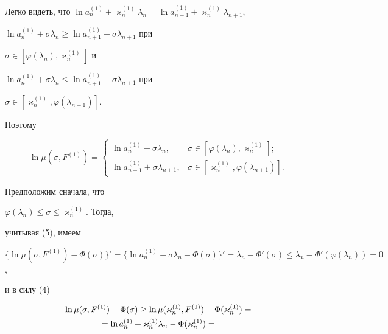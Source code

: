 \begin{pf}
Легко видеть, что $\ln a^{(1)}_n+\varkappa^{(1)}_n\lambda_n=


\ln a^{(1)}_{n+1}+\varkappa^{(1)}_n\lambda_{n+1}$,


$\ln a^{(1)}_n+\sigma\lambda_n\ge\ln a^{(1)}_{n+1}+\sigma\lambda_{n+1}$ при


$\sigma\in[\varphi(\lambda_n),\varkappa^{(1)}_n]$ и


$\ln a^{(1)}_n+\sigma\lambda_n\le\ln a^{(1)}_{n+1}+\sigma\lambda_{n+1}$ при


$\sigma\in[\varkappa^{(1)}_n,\varphi(\lambda_{n+1})]$.


Поэтому


\begin{equation}


\ln\mu(\sigma,F^{(1)})=


\begin{cases}


\ln a^{(1)}_n+\sigma\lambda_n, &


\sigma\in[\varphi(\lambda_n),\varkappa^{(1)}_n];\\


\ln a^{(1)}_{n+1}+\sigma\lambda_{n+1}, &


\sigma\in[\varkappa^{(1)}_n,\varphi(\lambda_{n+1})].


\end{cases}


\end{equation}





Предположим сначала, что


$\varphi(\lambda_n)\le \sigma \le\varkappa^{(1)}_n$. Тогда,


учитывая (5), имеем


$\{\ln\mu(\sigma,F^{(1)})-\Phi(\sigma)\}'=


\{\ln a^{(1)}_n+\sigma\lambda_n-\Phi(\sigma)\}'=


\lambda_n-\Phi'(\sigma)\le\lambda_n-\Phi'(\varphi(\lambda_n))=0$,


и в силу (4)


\begin{gather}




\ln\mu(\sigma,F^{(1)})-\Phi(\sigma)\ge 


\ln\mu(\varkappa^{(1)}_n,F^{(1)})-\Phi(\varkappa^{(1)}_n)=\notag\\


%


=\ln a^{(1)}_n+\varkappa^{(1)}_n\lambda_n-\Phi(\varkappa^{(1)}_n)=\notag\\



\end{gather}
\end{pf}
